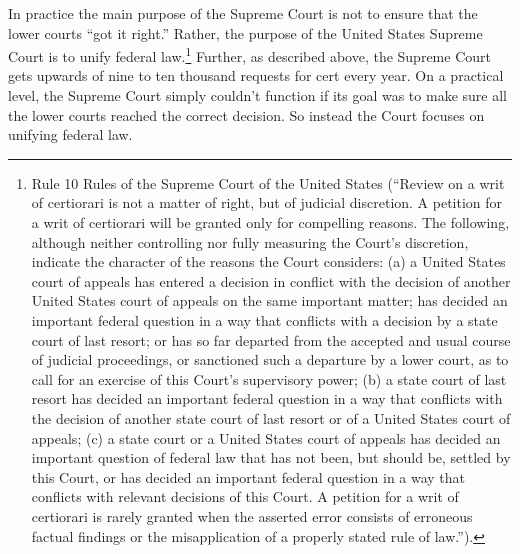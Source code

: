 In practice the main purpose of the Supreme Court is not to ensure that the lower courts ``got it right.''  
Rather, the purpose of the United States Supreme Court is to unify federal law.\footnote{Rule 10 Rules of the Supreme Court of the United States (``Review on a writ of certiorari is not a matter of right, but of judicial discretion. A petition for a writ of certiorari will be granted only for compelling reasons. The following, although neither controlling nor fully measuring the Court's discretion, indicate the character of the reasons the Court considers: (a) a United States court of appeals has entered a decision in conflict with the decision of another United States court of appeals on the same important matter; has decided an important federal question in a way that conflicts with a decision by a state court of last resort; or has so far departed from the accepted and usual course of judicial proceedings, or sanctioned such a departure by a lower court, as to call for an exercise of this Court's supervisory power;  (b) a state court of last resort has decided an important federal question in a way that conflicts with the decision of another state court of last resort or of a United States court of appeals; (c) a state court or a United States court of appeals has decided an important question of federal law that has not been, but should be, settled by this Court, or has decided an important federal question in a way that conflicts with relevant decisions of this Court.  A petition for a writ of certiorari is rarely granted when the asserted error consists of erroneous factual findings or the misapplication of a properly stated rule of law.'').}  Further, as described above, the Supreme Court gets upwards of nine to ten thousand requests for cert every year.  
On a practical level, the Supreme Court simply couldn't function if its goal was to make sure all the lower courts reached the correct decision.  So instead the Court focuses on unifying federal law.

